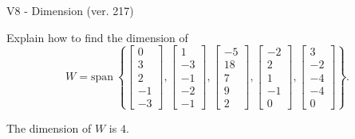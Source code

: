 \begin{exercise}
  \begin{exerciseTitle}V8 - Dimension (ver. 217)\end{exerciseTitle}
  \begin{exerciseStatement}
    Explain how to find the dimension of 
\[W=\mathrm{span}\ \left\{\left[\begin{array}{r}
0 \\
3 \\
2 \\
-1 \\
-3
\end{array}\right] , \left[\begin{array}{r}
1 \\
-3 \\
-1 \\
-2 \\
-1
\end{array}\right] , \left[\begin{array}{r}
-5 \\
18 \\
7 \\
9 \\
2
\end{array}\right] , \left[\begin{array}{r}
-2 \\
2 \\
1 \\
-1 \\
0
\end{array}\right] , \left[\begin{array}{r}
3 \\
-2 \\
-4 \\
-4 \\
0
\end{array}\right]\right\}.\]



  \end{exerciseStatement}
  \begin{exerciseAnswer}
   The dimension of \(W\) is  \(4\).
  


  \end{exerciseAnswer}
\end{exercise}